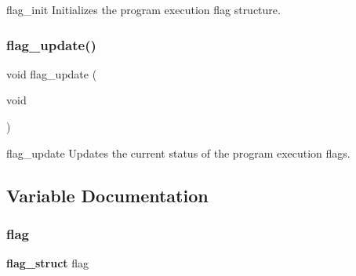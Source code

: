 flag\+\_\+init Initializes the program execution flag structure. \mbox{\label{flag_8h_a66960dac8a57870a9fba18923340dd80}} 
\subsubsection{flag\+\_\+update()}
{\footnotesize\ttfamily void flag\+\_\+update (\begin{DoxyParamCaption}\item[{void}]{ }\end{DoxyParamCaption})}

flag\+\_\+update Updates the current status of the program execution flags. 

\subsection{Variable Documentation}
\mbox{\label{flag_8h_a0f09f61ff68f5889d25a1d7db7703fd3}} 
\subsubsection{flag}
{\footnotesize\ttfamily \textbf{ flag\+\_\+struct} flag}

